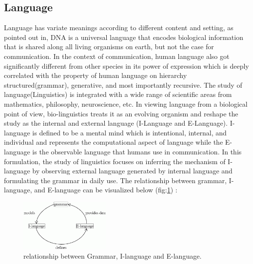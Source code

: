 \documentclass[12pt]{article}
\begin{document}
\subsection{Language} \label{introLanguage}
Language has variate meanings according to different content and setting, as pointed out in\cite{Hauser_2002}, DNA is a universal language that encodes biological information that is shared along all living organisms on earth, but not the case for communication. In the context of communication, human language also got significantly different from other species in its power of expression which is deeply correlated with the property of human language on hierarchy structured(grammar), generative, and most importantly recursive\cite{Hauser_2002}.  The study of language(Linguistics) is integrated with a wide range of scientific areas from mathematics, philosophy, neuroscience, etc\cite{Gallego_2022}. In viewing language from a biological point of view, bio-linguistics treats it as an evolving organism and reshape the study as the internal and external language (I-Language and E-Language)\cite{Gallego_2022}.  I-language is defined to be a mental mind which is intentional, internal, and individual and represents the computational aspect of language while the E-language is the observable language that humans use in communication\cite{Gallego_2022, Hauser_2002}.  
In this formulation, the study of linguistics focuses on inferring the mechanism of  I-language by observing external language generated by internal language and formulating the grammar in daily use. 
The relationship between grammar, I-language, and E-language can be visualized below (fig:\ref{fig:ilanguage}) \cite{Mark_2006}:
\begin{figure} [!h]
\begin{center}
\includegraphics[width=0.4\textwidth]{figures/iLanguage_eLanguage.png}
\caption{relationship between Grammar, I-language and E-language.}
\label{fig:ilanguage}
\end{center}
\end{figure}
\end{document}
